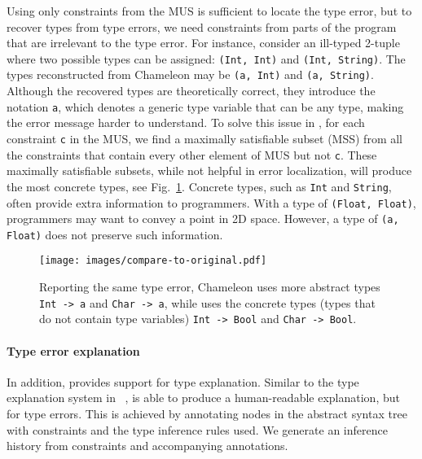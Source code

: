 Using only constraints from the MUS is sufficient to locate the type error, but to recover types from type errors, we need constraints from parts of the program that are irrelevant to the type error.  For instance, consider an ill-typed 2-tuple where two possible types can be assigned: \texttt{(Int, Int)} and \texttt{(Int, String)}. The types reconstructed from Chameleon may be \texttt{(a, Int)} and \texttt{(a, String)}. Although the recovered types are theoretically correct, they introduce the notation \texttt{a}, which denotes a generic type variable that can be any type, making the error message harder to understand. To solve this issue in \chameleon{}, for each constraint \texttt{c} in the MUS, we find a maximally satisfiable subset (MSS) from all the constraints that contain every other element of MUS but not \texttt{c}. These maximally satisfiable subsets, while not helpful in error localization, will produce the most concrete types, see Fig.~\ref{fig:compare-to-original}. Concrete types, such as \texttt{Int} and \texttt{String},  often provide extra information to programmers. With a type of \texttt{(Float, Float)}, programmers may want to convey a point in 2D space. However, a type of \texttt{(a, Float)} does not preserve such information.


\begin{figure}[ht]
    \centering
    \texttt{[image: images/compare-to-original.pdf]}
    \caption[Comparison between original Chameleon and \chameleon{}]{
Reporting the same type error, Chameleon uses more abstract types
\texttt{Int -> a} and \texttt{Char -> a}, while \chameleon{} uses the 
concrete types (types that do not contain type variables) \texttt{Int -> Bool} and \texttt{Char -> Bool}.
    }
    \label{fig:compare-to-original}
\end{figure}

 


\paragraph{Type error explanation}

In addition, \chameleon{} provides support for type explanation. Similar to the type explanation system in ~\cite{Jun2002-xp},  \chameleon{} is able to produce a human-readable explanation, but for type errors. This is achieved by annotating nodes in the abstract syntax tree with constraints and the type inference rules used. We generate an inference history from constraints and accompanying annotations. 


